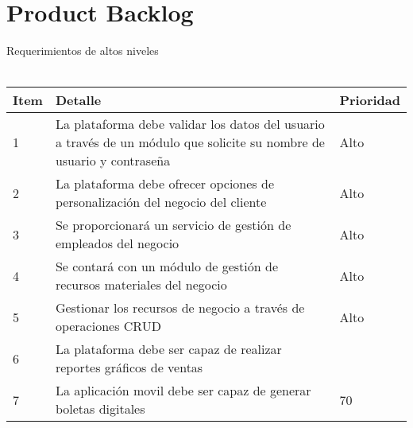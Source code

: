 \chapter{Product Backlog}
Requerimientos de altos niveles
\\\\

\begin{table}[htbp]
	\begin{center}
		\begin{tabular}{|p{0.8cm} | p{12cm} | p{2cm} |}
			\hline
			Item & Detalle & Prioridad \\
			\hline
			1 & La plataforma debe validar los datos del usuario a través de un módulo que solicite su nombre de usuario y contraseña & Alto \\
			\hline
			2 & La plataforma debe ofrecer opciones de personalización del negocio del cliente & Alto  \\
			\hline
			3 & Se proporcionará un servicio de gestión de empleados del negocio & Alto  \\
			\hline
			4 & Se contará con un módulo de gestión de recursos materiales del negocio & Alto  \\
			\hline
			5 & Gestionar los recursos de negocio a través de operaciones CRUD & Alto  \\
			\hline	
			6 & La plataforma debe ser capaz de realizar reportes gráficos de ventas &  \\
			\hline
			7 & La aplicación movil debe ser capaz de generar boletas digitales & 70 \\
			\hline
		\end{tabular}
	\end{center}
\end{table}
